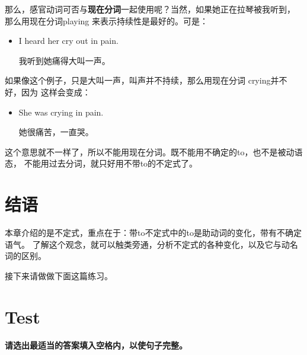 那么，感官动词可否与\textbf{现在分词}一起使用呢？当然，如果她正在拉琴被我听到，
那么用现在分词playing 来表示持续性是最好的。可是：
\begin{itemize}
\item  I heard her cry out in pain.

  我听到她痛得大叫一声。
\end{itemize}

如果像这个例子，只是大叫一声，叫声并不持续，那么用现在分词 crying并不好，因为
这样会变成：
\begin{itemize}
\item She was crying in pain.

  她很痛苦，一直哭。
\end{itemize}
这个意思就不一样了，所以不能用现在分词。既不能用不确定的to，也不是被动语态，
不能用过去分词，就只好用不带to的不定式了。

\section{结语}

本章介绍的是不定式，重点在于：带to不定式中的to是助动词的变化，带有不确定语气。
了解这个观念，就可以触类旁通，分析不定式的各种变化，以及它与动名词的区别。

接下来请做做下面这篇练习。

\section{Test}

\paragraph{请选出最适当的答案填入空格内，以使句子完整。}

